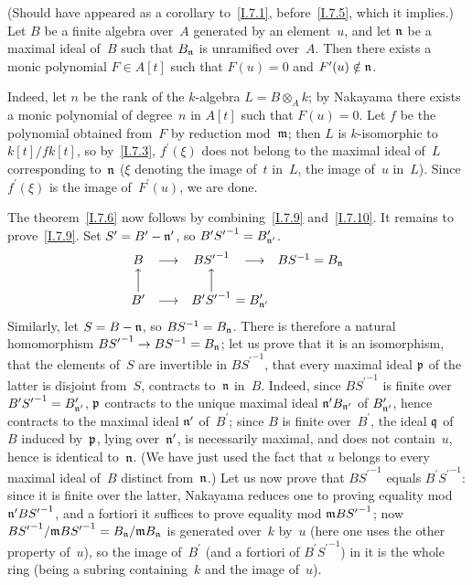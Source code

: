 \begin{lemma}
\label{I.7.10}
(Should have appeared as a corollary to~\ref{I.7.1},
before~\ref{I.7.5}, which it implies.) Let $B$ be a finite
algebra over~$A$ generated by an element~$u$, and let
$\mathfrak{n}$ be a maximal ideal of~$B$ such that $B_\mathfrak{n}$
is unramified over~$A$. Then there exists a monic polynomial
$F\in A[t]$ such that $F(u)=0$ and $F^\prime(u)\notin\mathfrak{n}$.
\end{lemma}

Indeed, let $n$ be the rank of the $k$-algebra $L=B\otimes_A k$;
by Nakayama there exists a monic polynomial of degree~$n$
in $A[t]$ such that $F(u)=0$. Let $f$ be the polynomial obtained
from~$F$ by reduction mod~$\mathfrak{m}$; then $L$ is $k$-isomorphic
to $k[t]/fk[t]$, so by~\ref{I.7.3}, $f^\prime(\xi)$ does not
belong to the maximal ideal of~$L$ corresponding to~$\mathfrak{n}$
($\xi$ denoting the image of~$t$ in~$L$, \ie the image of~$u$
in~$L$). Since $f^\prime(\xi)$ is the image of~$F^\prime(u)$,
we are done.

The
theorem~\ref{I.7.6} now follows by combining~\ref{I.7.9}
and~\ref{I.7.10}. It remains to prove~\ref{I.7.9}. Set
$S^\prime=B^\prime-\mathfrak{n}^\prime$, so
$B^\prime{S^\prime}^{-1}=B^\prime_{\mathfrak{n}^\prime}$.
\[
\begin{array}{ccccc}
B&\longrightarrow&B{S^\prime}^{-1}&\longrightarrow&BS^{-1} =
B_\goth{n}\\ \Big\uparrow&&\Big\uparrow&&\\
B^\prime&\longrightarrow&B^\prime{S^\prime}^{-1}
\rlap{\hbox{$\displaystyle \ = B^\prime_{\goth{n}^\prime}$}}&&
\end{array}
\]
Similarly, let $S=B-\mathfrak{n}$, so $BS^{-1}=B_\mathfrak{n}$.
There is therefore a natural homomorphism
$B{S^\prime}^{-1}\to BS^{-1}=B_\goth{n}$; let us prove that
it is an isomorphism, \ie that the elements of~$S$ are invertible
in $B{S^\prime}^{-1}$, \ie that every maximal ideal $\mathfrak{p}$
of the latter is disjoint from~$S$, \ie contracts to~$\mathfrak{n}$
in~$B$. Indeed, since $B{S^\prime}^{-1}$ is finite over
$B^\prime{S^\prime}^{-1}=B^\prime_{\mathfrak{n}^\prime}$,
$\mathfrak{p}$ contracts to the unique maximal ideal
$\mathfrak{n}^\prime B_{\mathfrak{n}^\prime}$ of
$B^\prime_{\mathfrak{n}^\prime}$, hence contracts to the maximal
ideal $\mathfrak{n}^\prime$ of~$B^\prime$; since $B$ is finite
over~$B^\prime$, the ideal $\mathfrak{q}$ of~$B$ induced
by~$\mathfrak{p}$, lying over~$\mathfrak{n}^\prime$, is necessarily
maximal, and does not contain~$u$, hence is identical
to~$\mathfrak{n}$. (We have just used the fact that $u$ belongs
to every maximal ideal of~$B$ distinct from~$\mathfrak{n}$.)
Let us now prove that $B{S^\prime}^{-1}$ equals
$B^\prime{S^\prime}^{-1}$: since it is finite over the latter,
Nakayama reduces one to proving equality mod
$\mathfrak{n}^\prime B{S^\prime}^{-1}$, and a fortiori it suffices
to prove equality mod $\mathfrak{m}B{S^\prime}^{-1}$; now
$B{S^\prime}^{-1}/\mathfrak{m}B{S^\prime}^{-1}
=B_\mathfrak{n}/\mathfrak{m}B_\mathfrak{n}$ is generated over~$k$ by~$u$
(here one uses the other property of~$u$), so the image
of~$B^\prime$ (and a fortiori of $B^\prime{S^\prime}^{-1}$)
in it is the whole ring (being a subring containing~$k$
and the image of~$u$).

